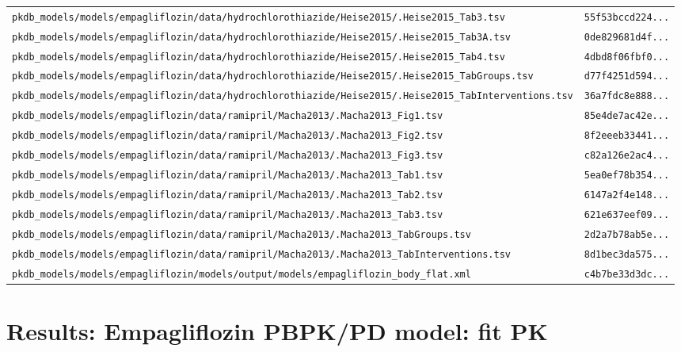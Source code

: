 \begin{longtable}{ll}
\texttt{pkdb\_models/models/empagliflozin/data/hydrochlorothiazide/Heise2015/.Heise2015\_Tab3.tsv} & \texttt{55f53bccd224...} \\
\texttt{pkdb\_models/models/empagliflozin/data/hydrochlorothiazide/Heise2015/.Heise2015\_Tab3A.tsv} & \texttt{0de829681d4f...} \\
\texttt{pkdb\_models/models/empagliflozin/data/hydrochlorothiazide/Heise2015/.Heise2015\_Tab4.tsv} & \texttt{4dbd8f06fbf0...} \\
\texttt{pkdb\_models/models/empagliflozin/data/hydrochlorothiazide/Heise2015/.Heise2015\_TabGroups.tsv} & \texttt{d77f4251d594...} \\
\texttt{pkdb\_models/models/empagliflozin/data/hydrochlorothiazide/Heise2015/.Heise2015\_TabInterventions.tsv} & \texttt{36a7fdc8e888...} \\
\texttt{pkdb\_models/models/empagliflozin/data/ramipril/Macha2013/.Macha2013\_Fig1.tsv} & \texttt{85e4de7ac42e...} \\
\texttt{pkdb\_models/models/empagliflozin/data/ramipril/Macha2013/.Macha2013\_Fig2.tsv} & \texttt{8f2eeeb33441...} \\
\texttt{pkdb\_models/models/empagliflozin/data/ramipril/Macha2013/.Macha2013\_Fig3.tsv} & \texttt{c82a126e2ac4...} \\
\texttt{pkdb\_models/models/empagliflozin/data/ramipril/Macha2013/.Macha2013\_Tab1.tsv} & \texttt{5ea0ef78b354...} \\
\texttt{pkdb\_models/models/empagliflozin/data/ramipril/Macha2013/.Macha2013\_Tab2.tsv} & \texttt{6147a2f4e148...} \\
\texttt{pkdb\_models/models/empagliflozin/data/ramipril/Macha2013/.Macha2013\_Tab3.tsv} & \texttt{621e637eef09...} \\
\texttt{pkdb\_models/models/empagliflozin/data/ramipril/Macha2013/.Macha2013\_TabGroups.tsv} & \texttt{2d2a7b78ab5e...} \\
\texttt{pkdb\_models/models/empagliflozin/data/ramipril/Macha2013/.Macha2013\_TabInterventions.tsv} & \texttt{8d1bec3da575...} \\
\texttt{pkdb\_models/models/empagliflozin/models/output/models/empagliflozin\_body\_flat.xml} & \texttt{c4b7be33d3dc...} \\
\end{longtable}

\section{Results: Empagliflozin PBPK/PD model: fit PK}

